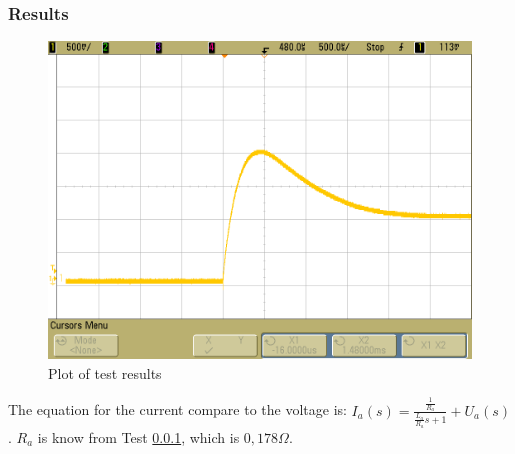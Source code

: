 \subsubsection{Results}

\begin{figure}[H]
	\centering
	\includegraphics[scale=.4]{figures/Exercise2}
	\caption{Plot of test results}
\end{figure}

The equation for the current compare to the voltage is:
$I_a (s) = \frac{\frac{1}{R_a}}{\frac{L_a}{R_a} s + 1} + U_a (s)$. $R_a$ is know from Test \ref{}, which is $0,178 \Omega$. 
